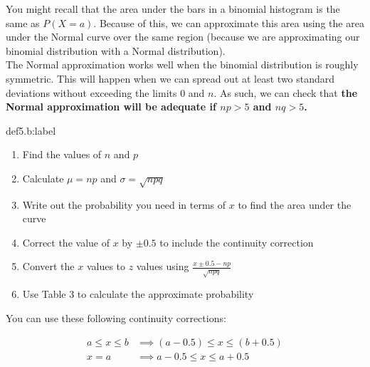 You might recall that the area under the bars in a binomial histogram is the same as $P(X=a)$. Because of this, we can approximate this area using the area under the Normal curve over the same region (because we are approximating our binomial distribution with a Normal distribution).\\

The Normal approximation works well when the binomial distribution is roughly symmetric. This will happen when we can spread out at least two standard deviations without exceeding the limits $0$ and $n$. As such, we can check that \bf{the Normal approximation will be adequate if $np > 5$ and $nq > 5$}.

\newpage
\begin{definition}{def5.b:label}
    \begin{enumerate}
        \item Find the values of $n$ and $p$
        \item Calculate $\mu = np$ and $\sigma = \sqrt{npq}$
        \item Write out the probability you need in terms of $x$ to find the area under the curve
        \item Correct the value of $x$ by $\pm 0.5$ to include the continuity correction
        \item Convert the $x$ values to $z$ values using $\frac{x \pm 0.5 - np}{\sqrt{npq}}$
        \item Use Table 3 to calculate the approximate probability
    \end{enumerate}

    You can use these following continuity corrections:

    $$
    \begin{aligned}
        a \le x \le b &\implies (a-0.5) \le x \le (b+0.5)\\
        x = a & \implies a-0.5 \le x \le a + 0.5
    \end{aligned}
    $$
\end{definition}

